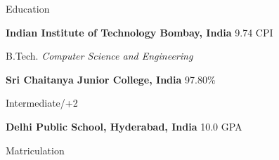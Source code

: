\begin{rubric}{Education}

\entry*[2019 -- 2022*]%
	\textbf{Indian Institute of Technology Bombay, India} \hfill 9.74 CPI
	\par B.Tech. \emph{Computer Science and Engineering}


\entry*[2017 -- 2019]%
	\textbf{Sri Chaitanya Junior College, India} \hfill 97.80\% \par
	Intermediate/+2
	

\entry*[2010 -- 2017]%
	\textbf{Delhi Public School, Hyderabad, India} \hfill 10.0 GPA \par
	Matriculation
\end{rubric}